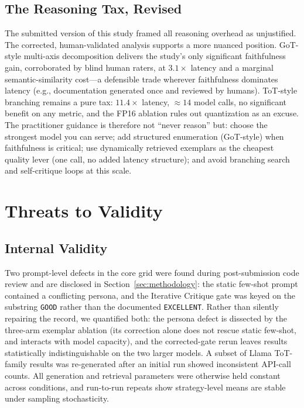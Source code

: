 \documentclass[pdflatex,sn-mathphys-ay]{sn-jnl}%
\theoremstyle{thmstyleone}%
\theoremstyle{thmstyletwo}%
\theoremstyle{thmstylethree}%
\begin{document}
\subsection{The Reasoning Tax, Revised}
The submitted version of this study framed all reasoning overhead as unjustified. The corrected, human-validated analysis supports a more nuanced position. GoT-style multi-axis decomposition delivers the study's only significant faithfulness gain, corroborated by blind human raters, at $3.1\times$ latency and a marginal semantic-similarity cost---a defensible trade wherever faithfulness dominates latency (e.g., documentation generated once and reviewed by humans). ToT-style branching remains a pure tax: $11.4\times$ latency, ${\approx}14$ model calls, no significant benefit on any metric, and the FP16 ablation rules out quantization as an excuse. The practitioner guidance is therefore not ``never reason'' but: choose the strongest model you can serve; add structured enumeration (GoT-style) when faithfulness is critical; use dynamically retrieved exemplars as the cheapest quality lever (one call, no added latency structure); and avoid branching search and self-critique loops at this scale.

\section{Threats to Validity}
\label{sec:threats}

\subsection{Internal Validity}
Two prompt-level defects in the core grid were found during post-submission code review and are disclosed in Section~\ref{sec:methodology}: the static few-shot prompt contained a conflicting persona, and the Iterative Critique gate was keyed on the substring \texttt{GOOD} rather than the documented \texttt{EXCELLENT}. Rather than silently repairing the record, we quantified both: the persona defect is dissected by the three-arm exemplar ablation (its correction alone does not rescue static few-shot, and interacts with model capacity), and the corrected-gate rerun leaves results statistically indistinguishable on the two larger models. A subset of Llama ToT-family results was re-generated after an initial run showed inconsistent API-call counts. All generation and retrieval parameters were otherwise held constant across conditions, and run-to-run repeats show strategy-level means are stable under sampling stochasticity.
\end{document}
